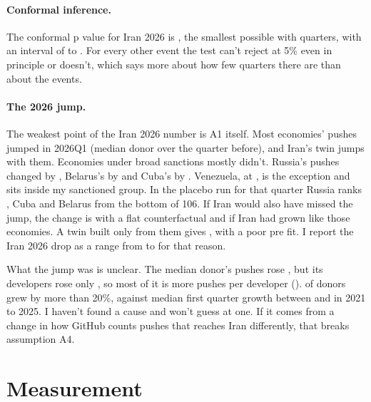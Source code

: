 \documentclass[11pt]{article}
\begin{document}
\paragraph{Conformal inference.} The conformal p value for Iran 2026 is \confIRc{}, the smallest possible with \confnIRc{} quarters, with an interval of \confloIRc{} to \confhiIRc. For every other event the test can't reject at 5\% even in principle or doesn't, which says more about how few quarters there are than about the events.

\paragraph{The 2026 jump.} The weakest point of the Iran 2026 number is A1 itself. Most economies' pushes jumped in 2026Q1 (median donor \jumpmedian{} over the quarter before), and Iran's twin jumps with them. Economies under broad sanctions mostly didn't. Russia's pushes changed by \jumpRU, Belarus's by \jumpBY{} and Cuba's by \jumpCU. Venezuela, at \jumpVE, is the exception and sits inside my sanctioned group. In the placebo run for that quarter Russia ranks \rankRU, Cuba \rankCU{} and Belarus \rankBY{} from the bottom of 106. If Iran would also have missed the jump, the change is \flatIR{} with a flat counterfactual and \sancgrowthIR{} if Iran had grown like those economies. A twin built only from them gives \sanctwinIR, with a poor pre fit. I report the Iran 2026 drop as a range from \flatIR{} to \sdidIRc{} for that reason.

What the jump was is unclear. The median donor's pushes rose \jumpmedian{}, but its developers rose only \jumpdev, so most of it is more pushes per developer (\jumpperdev). \jumpshare{} of donors grew by more than 20\%, against median first quarter growth between \jumpearlylo{} and \jumpearlyhi{} in 2021 to 2025. I haven't found a cause and won't guess at one. If it comes from a change in how GitHub counts pushes that reaches Iran differently, that breaks assumption A4.

\section{Measurement}
\label{sec:measurement}
\end{document}
